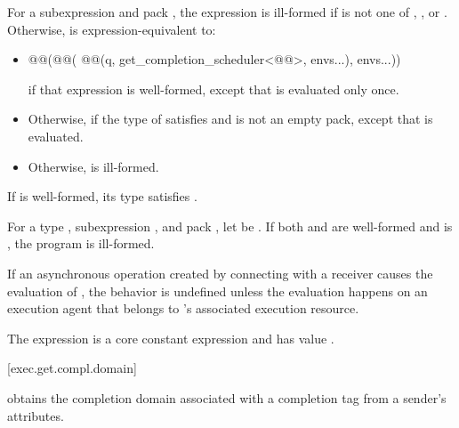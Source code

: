 \pnum
For a subexpression  and pack ,
the expression 
is ill-formed if  is not one of
, , or .
Otherwise, 
is expression-equivalent to:
\begin{itemize}
\item
\begin{codeblock}
@@(@@(
  @@(q, get_completion_scheduler<@@>, envs...), envs...))
\end{codeblock}
if that expression is well-formed,
except that  is evaluated only once.
\item
Otherwise, 
if the type of  satisfies  and
 is not an empty pack,
except that  is evaluated.
\item
Otherwise, 
is ill-formed.
\end{itemize}
\mandates
If 
is well-formed,
its type satisfies .

\pnum
For a type , subexpression , and pack ,
let  be
.
If both  and
 are well-formed and
 is ,
the program is ill-formed.

\pnum
If an asynchronous operation
created by connecting  with a receiver 
causes the evaluation of ,
the behavior is undefined
unless the evaluation happens on an execution agent
that belongs to 's associated execution resource.

\pnum
The expression
is a core constant expression and has value .

[exec.get.compl.domain]{}

\pnum
{}
obtains the completion domain associated with a completion tag
from a sender's attributes.

